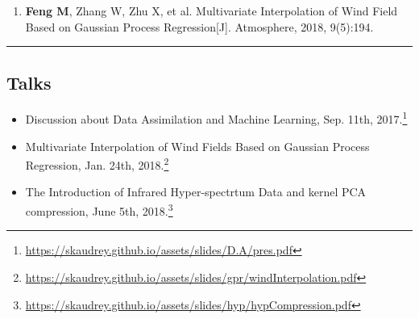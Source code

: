 \documentclass[10pt,letterpaper]{article}
\begin{document}
\begin{enumerate}
	\parskip=0.1em
	
	\item \textbf{Feng M}, Zhang W, Zhu X, et al. Multivariate Interpolation of Wind Field Based on Gaussian Process Regression[J]. Atmosphere, 2018, 9(5):194.
	
%	

\end{enumerate}

%
%	
%	
%		
%	
%

\hrule
\vspace{-0.4em}
\subsection*{Talks}

\begin{itemize}
	\parskip=0.1em
	
	\item Discussion about Data Assimilation and Machine Learning, Sep. 11th, 2017.\footnote{\url{https://skaudrey.github.io/assets/slides/D.A/pres.pdf}}

	\item Multivariate Interpolation of Wind Fields Based on Gaussian Process Regression, Jan. 24th, 2018.\footnote{\url{https://skaudrey.github.io/assets/slides/gpr/windInterpolation.pdf}}
	
	\item The Introduction of Infrared Hyper-spectrtum Data and kernel PCA compression, June 5th, 2018.\footnote{\url{https://skaudrey.github.io/assets/slides/hyp/hypCompression.pdf}}
	
\end{itemize}
\end{document}
